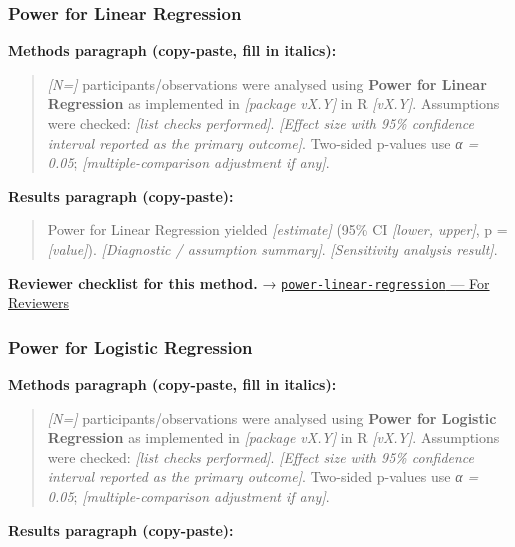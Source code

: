 \documentclass[
]{article}
\begin{document}
\subsubsection{Power for Linear
Regression}\label{power-for-linear-regression}

\textbf{Methods paragraph (copy-paste, fill in italics):}

\begin{quote}
\emph{{[}N={]}} participants/observations were analysed using
\textbf{Power for Linear Regression} as implemented in \emph{{[}package
vX.Y{]}} in R \emph{{[}vX.Y{]}}. Assumptions were checked: \emph{{[}list
checks performed{]}}. \emph{{[}Effect size with 95\% confidence interval
reported as the primary outcome{]}}. Two-sided p-values use \emph{α =
0.05}; \emph{{[}multiple-comparison adjustment if any{]}}.
\end{quote}

\textbf{Results paragraph (copy-paste):}

\begin{quote}
Power for Linear Regression yielded \emph{{[}estimate{]}} (95\% CI
\emph{{[}lower, upper{]}}, p = \emph{{[}value{]}}). \emph{{[}Diagnostic
/ assumption summary{]}}. \emph{{[}Sensitivity analysis result{]}}.
\end{quote}

\textbf{Reviewer checklist for this method.} →
\href{../chapters/05-power/power-linear-regression.Rmd\#for-reviewers}{\texttt{power-linear-regression}
--- For Reviewers}

\subsubsection{Power for Logistic
Regression}\label{power-for-logistic-regression}

\textbf{Methods paragraph (copy-paste, fill in italics):}

\begin{quote}
\emph{{[}N={]}} participants/observations were analysed using
\textbf{Power for Logistic Regression} as implemented in
\emph{{[}package vX.Y{]}} in R \emph{{[}vX.Y{]}}. Assumptions were
checked: \emph{{[}list checks performed{]}}. \emph{{[}Effect size with
95\% confidence interval reported as the primary outcome{]}}. Two-sided
p-values use \emph{α = 0.05}; \emph{{[}multiple-comparison adjustment if
any{]}}.
\end{quote}

\textbf{Results paragraph (copy-paste):}
\end{document}
